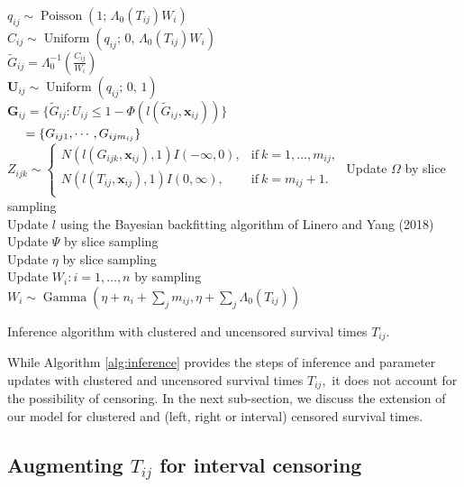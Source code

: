 \documentclass[11pt]{article}
\newcommand{\Gam}{\operatorname{Gamma}}
\newcommand{\Poisson}{\operatorname{Poisson}}
\newcommand{\Uniform}{\operatorname{Uniform}}
\begin{document}
\begin{algorithm}[t]
	
	
	{
		{
			{$q_{ij} \sim \Poisson(1; \, \Lambda_0(T_{ij})W_i)$\\
				$C_{ij} \sim \Uniform(q_{ij}; \, 0, \,  \Lambda_0(T_{ij})W_i)$\\
				$\tilde{G}_{ij} = \Lambda_0^{-1}(\frac{C_{ij}}{W_i})$\\
			$\mathbf{U}_{ij} \sim \Uniform(q_{ij}; \,  0, \, 1)$\\
				
				$\mathbf{G}_{ij} = \{\tilde{G}_{ij}: U_{ij} \le 1-\Phi(l(\tilde{G}_{ij}, \mathbf{x}_{ij}))\}$\\
				$\hspace{0.2in}=\{G_{ij1}, \cdots, G_{ijm_{ij}}\} $\\
				$Z_{ijk} \sim \begin{cases}
				N(l(G_{ijk}, \mathbf{x}_{ij}),1)I(-\infty,0), & \text{if}\ k=1,\dots,m_{ij},\\
				N(l(T_{ij}, \mathbf{x}_{ij}),1)I(0,\infty),  & \text{if}\ k=m_{ij}+1.\\
				\end{cases}$
			}
		}	
		Update $\Omega$ by slice sampling\\
		Update $l$ using the Bayesian backfitting algorithm of Linero and Yang (2018) \\
		Update $\Psi$ by slice sampling\\
		Update $\eta$ by slice sampling\\	
		Update $W_i: i = 1, \dots, n$ by sampling $W_i \sim \Gam(\eta + n_i + \sum_j m_{ij}, \eta + \sum_j \Lambda_0(T_{ij}))$
	}
	\caption{Inference algorithm with clustered and uncensored survival times $T_{ij}.$}
	\label{alg:inference}
\end{algorithm}

While Algorithm \ref{alg:inference} provides the steps of inference and parameter updates with clustered and uncensored survival times $T_{ij},$ it does not account for the possibility of censoring. In the next sub-section, we discuss the extension of our model for clustered and (left, right or interval) censored survival times.
\noindent
\subsection{Augmenting $T_{ij}$ for interval censoring}
\end{document}
